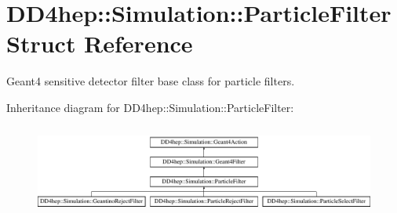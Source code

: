 \hypertarget{struct_d_d4hep_1_1_simulation_1_1_particle_filter}{}\section{D\+D4hep\+:\+:Simulation\+:\+:Particle\+Filter Struct Reference}
\label{struct_d_d4hep_1_1_simulation_1_1_particle_filter}


Geant4 sensitive detector filter base class for particle filters.  


Inheritance diagram for D\+D4hep\+:\+:Simulation\+:\+:Particle\+Filter\+:\begin{figure}[H]
\begin{center}
\leavevmode
\includegraphics[height=2.998662cm]{struct_d_d4hep_1_1_simulation_1_1_particle_filter}
\end{center}
\end{figure}
